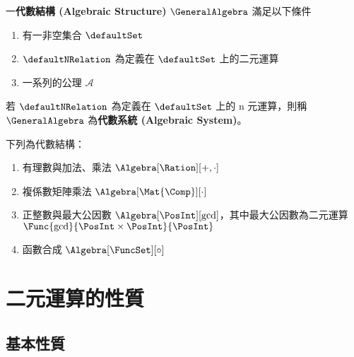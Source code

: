 \documentclass[12pt,a4paper,oneside]{report}
\begin{document}
\begin{CJK}{UTF8}{bkai}
\begin{mydef}[代數結構與代數系統]
\label{def:algebra:algebraic_structure}
一\textbf{代數結構 (Algebraic Structure)} $\GeneralAlgebra$ 滿足以下條件
\begin{enumerate}
\item 有一非空集合 $\defaultSet$
\item $\defaultNRelation$ 為定義在 $\defaultSet$ 上的二元運算
\item 一系列的公理 $\mathcal{A}$
\end{enumerate}
若 $\defaultNRelation$ 為定義在 $\defaultSet$ 上的 n 元運算，則稱 $\GeneralAlgebra$ 為\textbf{代數系統 (Algebraic System)}。
\end{mydef}

\begin{myexample}下列為代數結構：
\begin{enumerate}
\item 有理數與加法、乘法 $\Algebra[\Ration][+,\cdot]$
\item 複係數矩陣乘法 $\Algebra[\Mat{\Comp}][\cdot]$
\item 正整數與最大公因數 $\Algebra[\PosInt][\gcd]$，其中最大公因數為二元運算 $\Func{\gcd}{\PosInt\times{\PosInt}}{\PosInt}$
\item 函數合成 $\Algebra[\FuncSet][\circ]$
\end{enumerate}
\end{myexample}

\section{二元運算的性質}
\subsection{基本性質}


\end{CJK}
\end{document}
